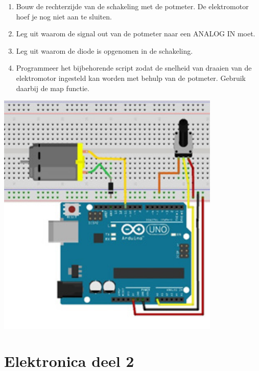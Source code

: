 \documentclass{arduino}
\begin{document}
\begin{enumerate}[label={\alph*})]
\item Bouw de rechterzijde van de schakeling met de potmeter. De elektromotor hoef je nog niet aan te sluiten.

\item Leg uit waarom de signal out van de potmeter naar een ANALOG IN moet.

\item Leg uit waarom de diode is opgenomen in de schakeling.

\item Programmeer het bijbehorende script zodat de snelheid van draaien van de elektromotor ingesteld kan worden met behulp van de potmeter. Gebruik daarbij de map functie.
\end{enumerate}

\begin{center}
\includegraphics[width=0.8\textwidth]{29. Circuit motor control}
\end{center}

\newpage

\section{Elektronica deel 2}


\end{document}
